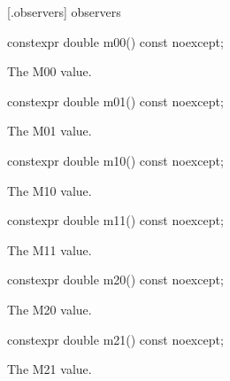  [\matrixtwod.observers] { observers}

\begin{itemdecl}
constexpr double m00() const noexcept;
\end{itemdecl}
\begin{itemdescr}
\pnum
\returns
The M00 value.
\end{itemdescr}

\begin{itemdecl}
constexpr double m01() const noexcept;
\end{itemdecl}
\begin{itemdescr}
\pnum
\returns
The M01 value.
\end{itemdescr}

\begin{itemdecl}
constexpr double m10() const noexcept;
\end{itemdecl}
\begin{itemdescr}
\pnum
\returns
The M10 value.
\end{itemdescr}

\begin{itemdecl}
constexpr double m11() const noexcept;
\end{itemdecl}
\begin{itemdescr}
\pnum
\returns
The M11 value.
\end{itemdescr}

\begin{itemdecl}
constexpr double m20() const noexcept;
\end{itemdecl}
\begin{itemdescr}
\pnum
\returns
The M20 value.
\end{itemdescr}

\begin{itemdecl}
constexpr double m21() const noexcept;
\end{itemdecl}
\begin{itemdescr}
\pnum
\returns
The M21 value.
\end{itemdescr}


